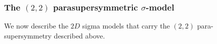 \documentclass[letterpaper,12pt]{article}
\newcommand{\p}{\partial}
\newcommand{\tth}{\tl{\theta}}
\def\tl{\tilde}
\theoremstyle{definition}
\theoremstyle{remark}
\theoremstyle{examples}
\begin{document}
%

\subsubsection{The $(2,2)$ parasupersymmetric $\sigma$-model}
We now describe the $2D$ sigma models that carry the $(2,2)$ para-supersymmetry described above.
\end{document}
